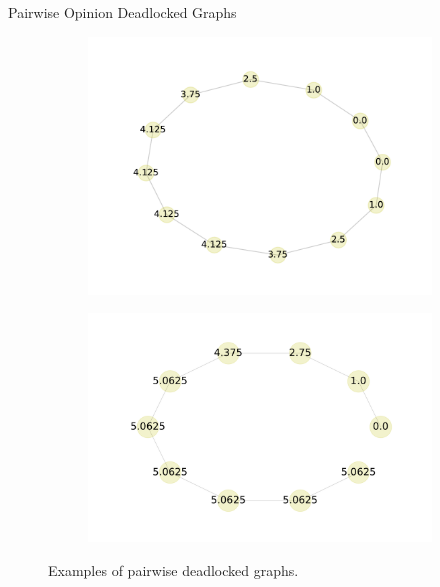 \documentclass[usenames,dvipsnames,10pt]{beamer}
\theoremstyle{remark}
\begin{document}
\begin{frame}{Pairwise Opinion Deadlocked Graphs}
    \begin{figure}[!htb]
    \centering
    \begin{subfigure}{.49\textwidth}
        \centering
    \includegraphics[scale=.3]{../Figures/success_graph_with_12_nodes_code_9.pdf}
    \label{fig:deadlockedCycle}
    \end{subfigure}
    \begin{subfigure}{.49\textwidth}
        \centering
    \includegraphics[scale=.18]{../Figures/success_graph_with_10_nodes_code_path_10.pdf}
    \label{fig:deadlockedPath}
    \end{subfigure}
    \caption{Examples of pairwise deadlocked graphs.}
\end{figure}
\end{frame}
\end{document}
